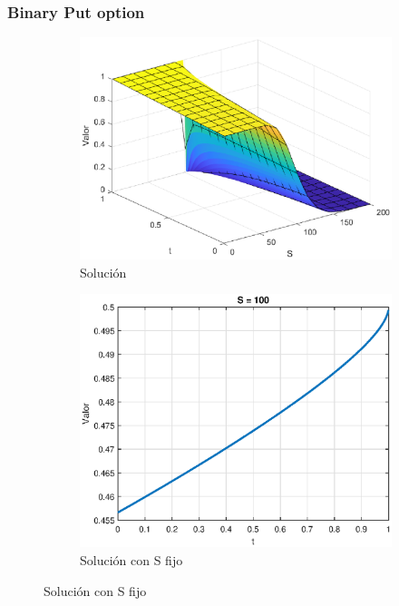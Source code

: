 \subsubsection{Binary Put option}
\begin{figure}[H]
    \centering
    \begin{subfigure}[b]{0.35\linewidth}
        \includegraphics[width=\linewidth]{Imagenes/Parte1/6_Sols/Binary_Put/BinaryPut3D.eps}
        \caption{Solución}
    \end{subfigure}
    \begin{subfigure}[b]{0.35\linewidth}
        \includegraphics[width=\linewidth]{Imagenes/Parte1/6_Sols/Binary_Put/BinaryPutSFijo.eps}
        \caption{Solución con S fijo}

\end{subfigure}
\end{figure}
